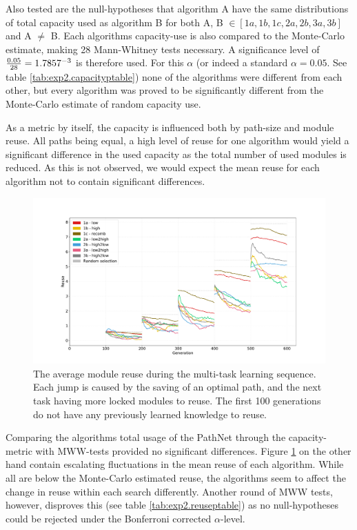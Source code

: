 Also tested are the null-hypotheses that algorithm A have the same distributions of total capacity used as algorithm B for both A, B \(\in [1a, 1b, 1c, 2a, 2b, 3a, 3b]\) and A \(\neq\) B. Each algorithms capacity-use is also compared to the Monte-Carlo estimate, making 28 Mann-Whitney tests necessary. A significance level of \(\frac{0.05}{28}=1.7857\time 10^{-3}\) is therefore used. For this \(\alpha\) (or indeed a standard \(\alpha=0.05\). See table \ref{tab:exp2.capacityptable}) none of the algorithms were different from each other, but every algorithm was proved to be significantly different from the Monte-Carlo estimate of random capacity use. 

As a metric by itself, the capacity is influenced both by path-size and module reuse. All paths being equal, a high level of reuse for one algorithm would yield a significant difference in the used capacity as the total number of used modules is reduced. As this is not observed, we would expect the mean reuse for each algorithm not to contain significant differences.

\begin{figure}
    \includegraphics[width=1.2\textwidth,center]{Chapters/4.Experiments/exp2/figures/inuse/Module_reuse_pr_generation.pdf}
    \caption[Module reuse plot]{The average module reuse during the multi-task learning sequence. Each jump is caused by the saving of an optimal path, and the next task having more locked modules to reuse. The first 100 generations do not have any previously learned knowledge to reuse.}
    \label{fig:search.reuse}
\end{figure}

Comparing the algorithms total usage of the PathNet through the capacity-metric with MWW-tests provided no significant differences. Figure \ref{fig:search.reuse} on the other hand contain escalating fluctuations in the mean reuse of each algorithm. While all are below the Monte-Carlo estimated reuse, the algorithms seem to affect the change in reuse within each search differently. Another round of MWW tests, however, disproves this (see table \ref{tab:exp2.reuseptable}) as no null-hypotheses could be rejected under the Bonferroni corrected \(\alpha\)-level.

